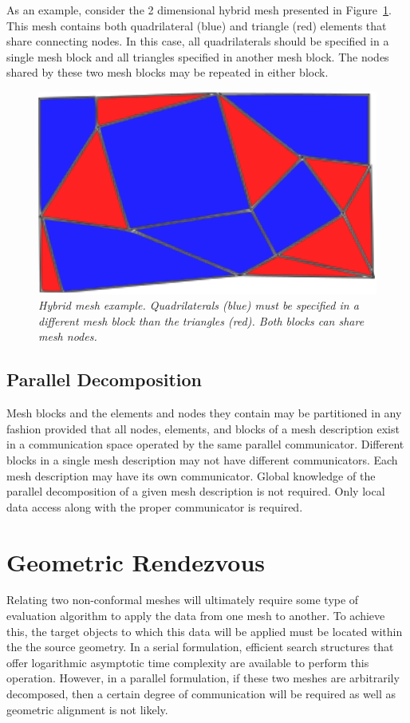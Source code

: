 \documentclass[letterpaper,12pt]{article}
\begin{document}
As an example, consider the 2 dimensional hybrid mesh presented in
Figure~\ref{fig:hybrid_mesh}. This mesh contains both quadrilateral
(blue) and triangle (red) elements that share connecting nodes. In
this case, all quadrilaterals should be specified in a single mesh
block and all triangles specified in another mesh block. The nodes
shared by these two mesh blocks may be repeated in either block.

\begin{figure}[htpb!]
  \centering
  \includegraphics[width=5in]{hybrid_mesh.eps}
  \caption{\sl Hybrid mesh example. Quadrilaterals (blue) must be
    specified in a different mesh block than the triangles (red). Both
    blocks can share mesh nodes.}
  \label{fig:hybrid_mesh}
\end{figure}

\subsection{Parallel Decomposition}\label{subsec:decomp}
Mesh blocks and the elements and nodes they contain may be partitioned
in any fashion provided that all nodes, elements, and blocks of a mesh
description exist in a communication space operated by the same
parallel communicator. Different blocks in a single mesh description
may not have different communicators. Each mesh description may have
its own communicator. Global knowledge of the parallel decomposition
of a given mesh description is not required. Only local data access
along with the proper communicator is required.

\clearpage

\section{Geometric Rendezvous}\label{sec:rendezvous}
Relating two non-conformal meshes will ultimately require some type of
evaluation algorithm to apply the data from one mesh to another. To
achieve this, the target objects to which this data will be applied
must be located within the the source geometry. In a serial
formulation, efficient search structures that offer logarithmic
asymptotic time complexity are available to perform this
operation. However, in a parallel formulation, if these two meshes are
arbitrarily decomposed, then a certain degree of communication will be
required as well as geometric alignment is not likely.
\end{document}
